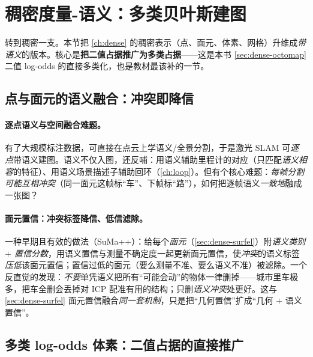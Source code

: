 \section{稠密度量-语义：多类贝叶斯建图}
\label{sec:semantic-dense}

转到稠密一支。本节把 \cref{ch:dense} 的稠密表示（点、面元、体素、网格）升维成\emph{带语义}的版本。核心是\textbf{把二值占据推广为多类占据}——这是本书 \cref{sec:dense-octomap} 二值 log-odds 的直接多类化，也是教材最该补的一节。

\subsection{点与面元的语义融合：冲突即降信}
\label{sec:semantic-dense-point}

\paragraph{逐点语义与空间融合难题。}
有了大规模标注数据，可直接在点云上学语义/全景分割\cite{milioto2019rangenet,behley2019semantickitti}，于是激光 SLAM 可\emph{逐点}带语义建图\cite{chen2019suma++}。语义不仅入图，还反哺：用语义辅助里程计的对应（只匹配\emph{语义相容}的特征）、用语义场景描述子辅助回环（\cref{ch:loop}）\cite{li2021saloam,kim2018scancontext}。但有个核心难题：\emph{每帧分割可能互相冲突}（同一面元这帧标“车”、下帧标“路”），如何把逐帧语义\emph{一致地}融成一张图？

\paragraph{面元置信：冲突标签降信、低信滤除。}
一种早期且有效的做法（SuMa++\cite{chen2019suma++}）：给每个\emph{面元}（\cref{sec:dense-surfel}）附\emph{语义类别 $+$ 置信分数}，用语义置信与测量不确定度一起更新面元置信，使\emph{冲突}的语义标签\emph{压低}该面元置信；置信过低的面元（要么测量不准、要么语义不准）被滤除\cite{chen2019suma++}。一个反直觉的发现：\emph{不要}单凭语义把所有“可能会动”的物体一律删掉——城市里车极多，把车全删会丢掉对 ICP 配准有用的结构；只删\emph{语义冲突}处更好\cite{chen2019suma++}。这与 \cref{sec:dense-surfel} 面元置信融合\emph{同一套机制}，只是把“几何置信”扩成“几何 $+$ 语义置信”。

\subsection{多类 log-odds 体素：二值占据的直接推广}
\label{sec:semantic-dense-voxel}

